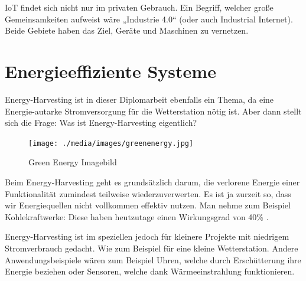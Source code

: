         IoT findet sich nicht nur im privaten Gebrauch. Ein Begriff, welcher große Gemeinsamkeiten aufweist wäre „Industrie 4.0“ (oder auch Industrial Internet). Beide Gebiete haben das Ziel, Geräte und Maschinen zu vernetzen.

\pagebreak


\section{Energieeffiziente Systeme}
Energy-Harvesting ist in dieser Diplomarbeit ebenfalls ein Thema, da eine Energie-autarke Stromversorgung für die Wetterstation nötig ist. Aber dann stellt sich die Frage: Was ist Energy-Harvesting eigentlich?

\begin{figure}[H]
    \centering
    \texttt{[image: ./media/images/greenenergy.jpg]}
    \caption{Green Energy Imagebild \cite{bib:genergy}}
    \label{fig:genergy}
\end{figure}

Beim Energy-Harvesting geht es grundsätzlich darum, die verlorene Energie einer Funktionalität zumindest teilweise wiederzuverwerten. Es ist ja zurzeit so, dass wir Energiequellen nicht vollkommen effektiv nutzen. Man nehme zum Beispiel Kohlekraftwerke: Diese haben heutzutage einen Wirkungsgrad von 40\% \cite{bib:kohle}. 

Energy-Harvesting ist im speziellen jedoch für kleinere Projekte mit niedrigem Stromverbrauch gedacht. Wie zum Beispiel für eine kleine Wetterstation. Andere Anwendungsbeispiele wären zum Beispiel Uhren, welche durch Erschütterung ihre Energie beziehen oder Sensoren, welche dank Wärmeeinstrahlung funktionieren.
